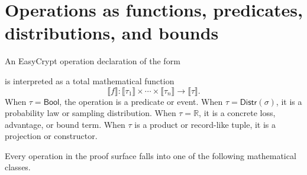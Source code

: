 \section{Operations as functions, predicates, distributions, and bounds}
\label{app:ops-as-functions}

An EasyCrypt operation declaration of the form
\begin{center}
\end{center}
is interpreted as a total mathematical function
\[
  \llbracket f \rrbracket :
  \llbracket \tau_1 \rrbracket \times \cdots \times
  \llbracket \tau_n \rrbracket
  \to \llbracket \tau \rrbracket .
\]
When \(\tau=\mathsf{Bool}\), the operation is a predicate or event.  When
\(\tau=\mathsf{Distr}(\sigma)\), it is a probability law or sampling
distribution.  When \(\tau=\mathbb{R}\), it is a concrete loss, advantage, or
bound term.  When \(\tau\) is a product or record-like tuple, it is a projection
or constructor.

Every operation in the proof surface falls into one of the following
mathematical classes.

